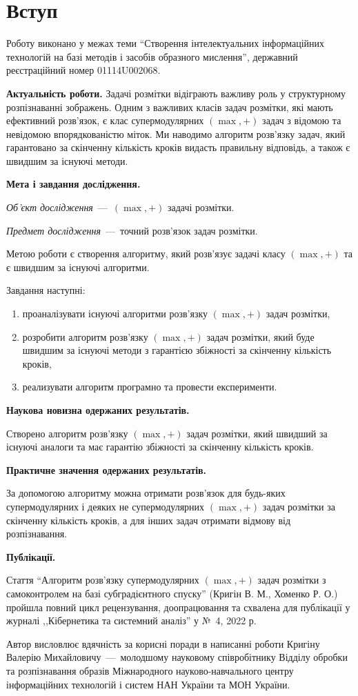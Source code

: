 \chapter*{Вступ}

Роботу виконано у межах теми ``Створення інтелектуальних інформаційних
технологій на базі методів і засобів образного мислення'',
державний реєстраційний номер 01114U002068.

\textbf{Актуальність роботи.}
Задачі розмітки відіграють важливу роль у структурному розпізнаванні
зображень. Одним з важливих класів задач
розмітки, які мають ефективний розв’язок, є клас супермодулярних
\((\max,+)\) задач з відомою  та невідомою впорядкованістю міток.
Ми наводимо алгоритм розв'язку задач, який гарантовано за скінченну кількість
кроків видасть правильну відповідь, а також є швидшим за існуючі методи.

\textbf{Мета і завдання дослідження.}

\textit{Об'єкт дослідження}~---~\((\max,+)\) задачі розмітки.

\textit{Предмет дослідження}~---~точний розв’язок задач розмітки.

Метою роботи є створення алгоритму, який розв'язує задачі класу
\((\max,+)\) та є швидшим за існуючі алгоритми.

Завдання наступні:
\begin{enumerate}
  \item
    проаналізувати існуючі алгоритми розв'язку \((\max,+)\) задач розмітки,
  \item
    розробити алгоритм розв'язку \((\max,+)\) задач розмітки, який буде
    швидшим за існуючі методи з гарантією збіжності за скінченну
    кількість кроків,
  \item
    реализувати алгоритм програмно та провести експерименти.
\end{enumerate}

\textbf{Наукова новизна одержаних результатів.}

Створено алгоритм розв'язку \((\max,+)\) задач розмітки, який швидший за
існуючі аналоги та має гарантію збіжності за скінченну кількість кроків.

\textbf{Практичне значення одержаних результатів.}

За допомогою алгоритму можна отримати розв'язок для будь-яких
супермодулярних і деяких не супермодулярних \((\max,+)\) задач розмітки
за скінченну кількість кроків,
а для інших задач отримати відмову від розпізнавання.

\textbf{Публікації.}

Стаття ``Алгоритм розв'язку супермодулярних $(\max, +)$ задач
розмітки з самоконтролем на базі субградієнтного спуску'' (Кригін В. М., Хоменко Р. О.)
пройшла повний цикл рецензування, доопрацювання та схвалена для
публікації у журналі
,,Кібернетика та системний аналіз'' у № 4, 2022 р.

Автор висловлює вдячність за корисні поради в написанні роботи Кригіну Валерію Михайловичу~---~молодшому
науковому співробітнику Відділу обробки та розпізнавання
образів Міжнародного науково-навчального центру інформаційних
технологій і систем НАН України та МОН України.